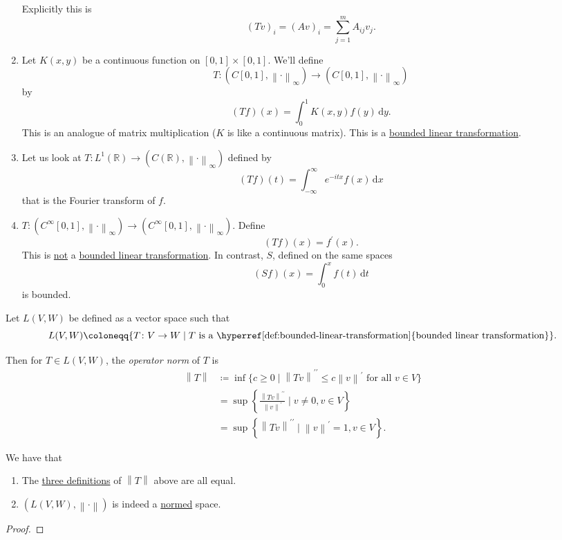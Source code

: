 \begin{eg}
\begin{enumerate}[(1)]
		      Explicitly this is
		      \[
			      (Tv)_i = (Av)_i = \sum_{j=1}^m A_{ij}v_j.
		      \]
		\item Let \(K(x,y)\) be a continuous function on \([0,1] \times [0,1]\). We'll define
		      \[
			      T \colon (C[0,1],\left\lVert \cdot\right\rVert _\infty) \to (C[0,1], \left\lVert \cdot\right\rVert _\infty)
		      \]
		      by
		      \[
			      (Tf)(x) = \int_0^1 K(x,y)f(y) \,\mathrm{d} y.
		      \]
		      This is an analogue of matrix multiplication (\(K\) is like a continuous matrix). This is a \hyperref[def:bounded-linear-transformation]{bounded linear transformation}.
		\item Let us look at \(T \colon L^1(\mathbb{R}) \to (C(\mathbb{R}),\left\lVert \cdot\right\rVert _\infty)\) defined by
		      \[
			      (Tf)(t) = \int_{-\infty}^\infty e^{-itx}f(x) \,\mathrm{d} x
		      \]
		      that is the Fourier transform of \(f\).
		\item \(T \colon (C^\infty[0,1],\left\lVert \cdot\right\rVert _\infty) \to (C^\infty[0,1], \left\lVert \cdot\right\rVert _\infty)\). Define
		      \[
			      (Tf)(x) = f^\prime (x).
		      \]
		      This is \underline{not} a \hyperref[def:bounded-linear-transformation]{bounded linear transformation}. In contrast, \(S\), defined on the same spaces
		      \[
			      (Sf)(x) = \int_0^x f(t) \,\mathrm{d} t
		      \]
		      is bounded.
	\end{enumerate}
\end{eg}

\begin{definition}\label{def:operator-norm}
	Let \(L(V, W)\) be defined as a vector space such that
	\[
		L(V,W) \coloneqq \{T \colon V \to W \mid T \text{ is a \hyperref[def:bounded-linear-transformation]{bounded linear transformation}}\}.
	\]

	Then for \(T \in L(V,W)\), the \emph{operator norm} of \(T\) is
	\[
		\begin{split}
			\left\lVert T\right\rVert & \coloneqq \inf\{c \geq 0 \mid \left\lVert Tv\right\rVert^{\prime\prime}  \leq c\left\lVert v\right\rVert^\prime  \text{ for all } v \in V\} \\
			& = \sup\left\{ \frac{\left\lVert Tv\right\rVert^{\prime\prime}}{\left\lVert v\right\rVert^\prime } \mid v \neq 0, v \in V\right\}           \\
			& = \sup\left\{ \left\lVert Tv\right\rVert^{\prime\prime} \mid \left\lVert v\right\rVert^\prime  = 1, v \in V\right\}.
		\end{split}
	\]
\end{definition}

\begin{lemma}
	We have that
	\begin{enumerate}[(1)]
		\item The \hyperref[def:operator-norm]{three definitions} of \(\left\lVert T\right\rVert\) above are all equal.
		\item \((L(V,W), \left\lVert \cdot\right\rVert )\) is indeed a \hyperref[def:norm]{normed} space.
	\end{enumerate}
\end{lemma}
\begin{proof}
\end{proof}